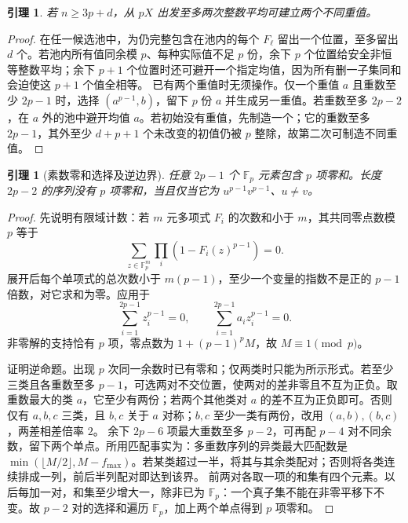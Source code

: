 \documentclass[11pt,a4paper]{article}
\newcommand{\F}{\mathbb F}
\newtheorem{lemma}[theorem]{引理}
\theoremstyle{definition}
\numberwithin{equation}{section}
\begin{document}
\begin{lemma}\label{lem:initialize}
若 $n\ge3p+d$，从 $pX$ 出发至多两次整数平均可建立两个不同重值。
\end{lemma}
\begin{proof}
在任一候选池中，为仍完整包含在池内的每个 $F_\ell$ 留出一个位置，至多留出 $d$ 个。若池内所有值同余模 $p$、每种实际值不足 $p$ 份，余下 $p$ 个位置给安全非恒等整数平均；余下 $p+1$ 个位置时还可避开一个指定均值，因为所有删一子集同和会迫使这 $p+1$ 个值全相等。
已有两个重值时无须操作。仅一个重值 $a$ 且重数至少 $2p-1$ 时，选择 $(a^{p-1},b)$，留下 $p$ 份 $a$ 并生成另一重值。若重数至多 $2p-2$，在 $a$ 外的池中避开均值 $a$。若初始没有重值，先制造一个；它的重数至多 $2p-1$，其外至少 $d+p+1$ 个未改变的初值仍被 $p$ 整除，故第二次可制造不同重值。
\end{proof}

\begin{lemma}[素数零和选择及逆边界]\label{lem:egz}
任意 $2p-1$ 个 $\F_p$ 元素包含 $p$ 项零和。长度 $2p-2$ 的序列没有 $p$ 项零和，当且仅当它为 $u^{p-1}v^{p-1}$、$u\ne v$。
\end{lemma}
\begin{proof}
先说明有限域计数：若 $m$ 元多项式 $F_i$ 的次数和小于 $m$，其共同零点数模 $p$ 等于
\[\sum_{z\in\F_p^m}\prod_i(1-F_i(z)^{p-1})=0.
\]
展开后每个单项式的总次数小于 $m(p-1)$，至少一个变量的指数不是正的 $p-1$ 倍数，对它求和为零。应用于
\[\sum_{i=1}^{2p-1}z_i^{p-1}=0,\qquad
\sum_{i=1}^{2p-1}a_i z_i^{p-1}=0.
\]
非零解的支持恰有 $p$ 项，零点数为 $1+(p-1)^p M$，故 $M\equiv1\pmod p$。

证明逆命题。出现 $p$ 次同一余数时已有零和；仅两类时只能为所示形式。若至少三类且各重数至多 $p-1$，可选两对不交位置，使两对的差非零且不互为正负。取重数最大的类 $a$，它至少有两份；若两个其他类对 $a$ 的差不互为正负即可。否则仅有 $a,b,c$ 三类，且 $b,c$ 关于 $a$ 对称；$b,c$ 至少一类有两份，改用 $(a,b),(b,c)$，两差相差倍率 $2$。
余下 $2p-6$ 项最大重数至多 $p-2$，可再配 $p-4$ 对不同余数，留下两个单点。所用匹配事实为：多重数序列的异类最大匹配数是 $\min(\lfloor M/2\rfloor,M-f_{\max})$。若某类超过一半，将其与其余类配对；否则将各类连续排成一列，前后半列配对即达到该界。
前两对各取一项的和集有四个元素。以后每加一对，和集至少增大一，除非已为 $\F_p$：一个真子集不能在非零平移下不变。故 $p-2$ 对的选择和遍历 $\F_p$，加上两个单点得到 $p$ 项零和。
\end{proof}
\end{document}
